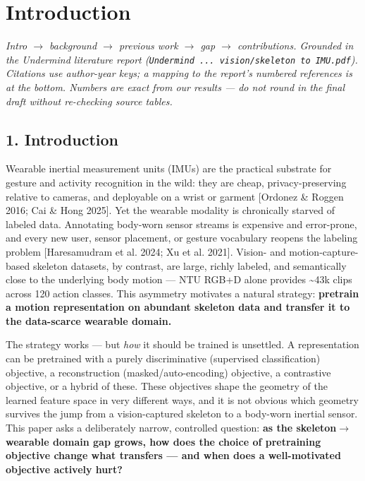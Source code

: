 \section{Introduction}

\textit{Intro $\rightarrow$ background $\rightarrow$ previous work $\rightarrow$ gap $\rightarrow$ contributions. Grounded in the Undermind literature report (\texttt{Undermind ... vision/skeleton to IMU.pdf}). Citations use author-year keys; a mapping to the report's numbered references is at the bottom. Numbers are exact from our results --- do not round in the final draft without re-checking source tables.}

\subsection{1. Introduction}

Wearable inertial measurement units (IMUs) are the practical substrate for gesture and activity recognition in the wild: they are cheap, privacy-preserving relative to cameras, and deployable on a wrist or garment [Ordonez \& Roggen 2016; Cai \& Hong 2025]. Yet the wearable modality is chronically starved of labeled data. Annotating body-worn sensor streams is expensive and error-prone, and every new user, sensor placement, or gesture vocabulary reopens the labeling problem [Haresamudram et al. 2024; Xu et al. 2021]. Vision- and motion-capture-based skeleton datasets, by contrast, are large, richly labeled, and semantically close to the underlying body motion --- NTU RGB+D alone provides \textasciitilde{}43k clips across 120 action classes. This asymmetry motivates a natural strategy: \textbf{pretrain a motion representation on abundant skeleton data and transfer it to the data-scarce wearable domain.}

The strategy works --- but \textit{how} it should be trained is unsettled. A representation can be pretrained with a purely discriminative (supervised classification) objective, a reconstruction (masked/auto-encoding) objective, a contrastive objective, or a hybrid of these. These objectives shape the geometry of the learned feature space in very different ways, and it is not obvious which geometry survives the jump from a vision-captured skeleton to a body-worn inertial sensor. This paper asks a deliberately narrow, controlled question: \textbf{as the skeleton$\rightarrow$wearable domain gap grows, how does the choice of pretraining objective change what transfers --- and when does a well-motivated objective actively hurt?}

